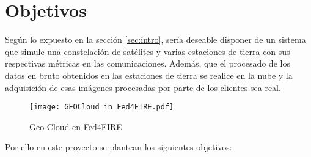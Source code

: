 
\section{Objetivos}
\label{sec:objetivos}

Según lo expuesto en la sección \ref{sec:intro}, sería deseable disponer de
un sistema que simule una constelación de satélites y varias estaciones de tierra con sus respectivas métricas en las comunicaciones. Además, que el procesado de los datos en bruto obtenidos en las estaciones de tierra se realice en la nube y la adquisición de esas imágenes procesadas por parte de los clientes sea real.

\begin{figure}
\begin{center}
\texttt{[image: GEOCloud\_in\_Fed4FIRE.pdf]}
\caption{Geo-Cloud en Fed4FIRE}
\end{center}
\end{figure}

Por ello en este proyecto se plantean los siguientes objetivos:

